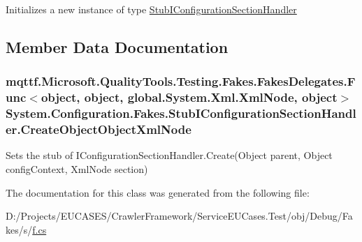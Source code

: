 Initializes a new instance of type \hyperlink{class_system_1_1_configuration_1_1_fakes_1_1_stub_i_configuration_section_handler}{Stub\-I\-Configuration\-Section\-Handler}



\subsection{Member Data Documentation}
\hypertarget{class_system_1_1_configuration_1_1_fakes_1_1_stub_i_configuration_section_handler_af2412dd2db9ff529f36d9109d476a156}{
\subsubsection[{Create\-Object\-Object\-Xml\-Node}]{\setlength{\rightskip}{0pt plus 5cm}mqttf.\-Microsoft.\-Quality\-Tools.\-Testing.\-Fakes.\-Fakes\-Delegates.\-Func$<$object, object, global.\-System.\-Xml.\-Xml\-Node, object$>$ System.\-Configuration.\-Fakes.\-Stub\-I\-Configuration\-Section\-Handler.\-Create\-Object\-Object\-Xml\-Node}}\label{class_system_1_1_configuration_1_1_fakes_1_1_stub_i_configuration_section_handler_af2412dd2db9ff529f36d9109d476a156}


Sets the stub of I\-Configuration\-Section\-Handler.\-Create(\-Object parent, Object config\-Context, Xml\-Node section)



The documentation for this class was generated from the following file\-:\begin{DoxyCompactItemize}
\item 
D\-:/\-Projects/\-E\-U\-C\-A\-S\-E\-S/\-Crawler\-Framework/\-Service\-E\-U\-Cases.\-Test/obj/\-Debug/\-Fakes/s/\hyperlink{s_2f_8cs}{f.\-cs}\end{DoxyCompactItemize}
